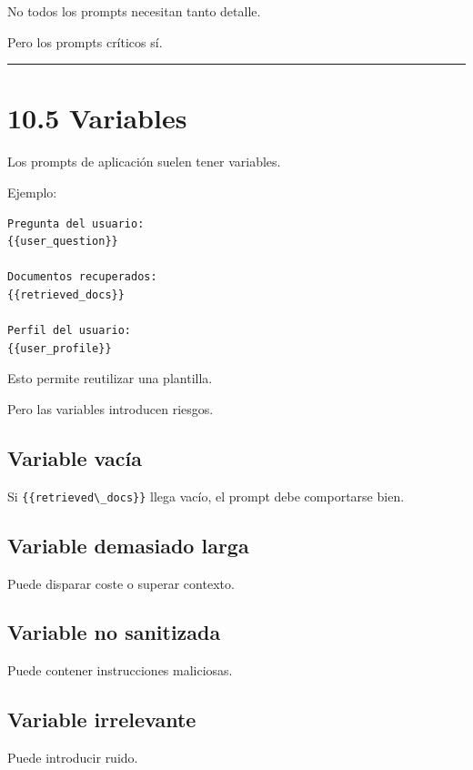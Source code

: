 No todos los prompts necesitan tanto detalle.

Pero los prompts críticos sí.

\begin{center}\rule{0.5\linewidth}{0.5pt}\end{center}

\section{10.5 Variables}\label{variables}

Los prompts de aplicación suelen tener variables.

Ejemplo:

\begin{lstlisting}
Pregunta del usuario:
{{user_question}}

Documentos recuperados:
{{retrieved_docs}}

Perfil del usuario:
{{user_profile}}
\end{lstlisting}

Esto permite reutilizar una plantilla.

Pero las variables introducen riesgos.

\subsection{Variable vacía}\label{variable-vacuxeda}

Si \passthrough{\lstinline!\{\{retrieved\_docs\}\}!} llega vacío, el
prompt debe comportarse bien.

\subsection{Variable demasiado larga}\label{variable-demasiado-larga}

Puede disparar coste o superar contexto.

\subsection{Variable no sanitizada}\label{variable-no-sanitizada}

Puede contener instrucciones maliciosas.

\subsection{Variable irrelevante}\label{variable-irrelevante}

Puede introducir ruido.

